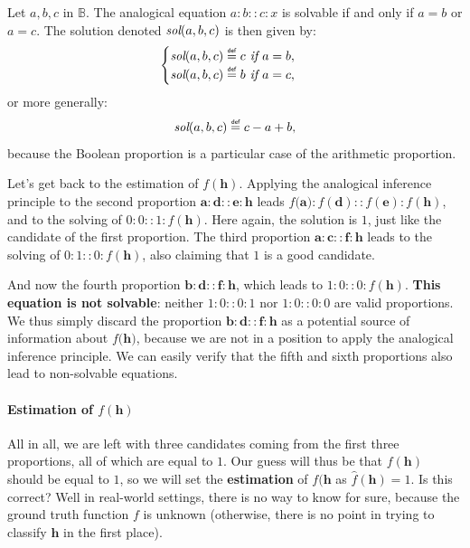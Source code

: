 \begin{proposition}
  \label{PROPOS:equation_solving}
  Let $a, b, c$ in $\mathbb{B}$. The analogical equation
  $a :b::c:x$
  is solvable if and only if $a = b$ or $a = c$. The solution denoted
  $\emph{sol}(a, b, c)$ is then given by:
  $$
  \begin{cases}
    \emph{sol}(a, b, c) \eqdef c \emph{ if } a = b,\\
    \emph{sol}(a, b, c) \eqdef b \emph{ if } a = c,
  \end{cases}
  $$
  or more generally:
  $$\emph{sol}(a, b, c) \eqdef c - a + b,$$
  because the Boolean proportion is a particular case of the arithmetic
  proportion.
\end{proposition}

Let's get back to the estimation of $f(\mathbf{h})$. Applying the analogical
inference principle to the second proportion $\mathbf{a} : \mathbf{d} ::
\mathbf{e} : \mathbf{h}$ leads $f(\mathbf{a)} : f(\mathbf{d}) :: f(\mathbf{e})
: f(\mathbf{h})$, and to the solving of $0:0::1:f(\mathbf{h})$. Here again, the
solution is $1$, just like the candidate of the first proportion.
The third proportion  $\mathbf{a} : \mathbf{c} :: \mathbf{f} : \mathbf{h}$
leads to the solving of $0:1::0:f(\mathbf{h})$, also claiming that $1$ is a good candidate.

And now the fourth proportion $\mathbf{b} : \mathbf{d} :: \mathbf{f} :
\mathbf{h}$, which leads to $1:0::0:f(\mathbf{h})$. \textbf{This equation is not
solvable}: neither $1:0::0:1$ nor $1:0::0:0$ are valid proportions. We thus
simply discard the proportion $\mathbf{b} : \mathbf{d} :: \mathbf{f} :
\mathbf{h}$ as a potential source of information about $f(\mathbf{h)}$, because
we are not in a position to apply the analogical inference principle. We can
easily verify that the fifth and sixth proportions also lead to non-solvable
equations.

\paragraph{Estimation of $f(\mathbf{h})$\\}

All in all, we are left with three candidates coming from the first three
proportions, all of which are equal to $1$. Our guess will thus be that
$f(\mathbf{h})$ should be equal to $1$, so we will set the \textbf{estimation} of
$f(\mathbf{h}$ as $\hat{f}(\mathbf{h}) = 1$. Is this correct? Well in real-world
settings, there is no way to know for sure, because the ground truth function
$f$ is unknown (otherwise, there is no point in trying to classify $\mathbf{h}$
in the first place).

